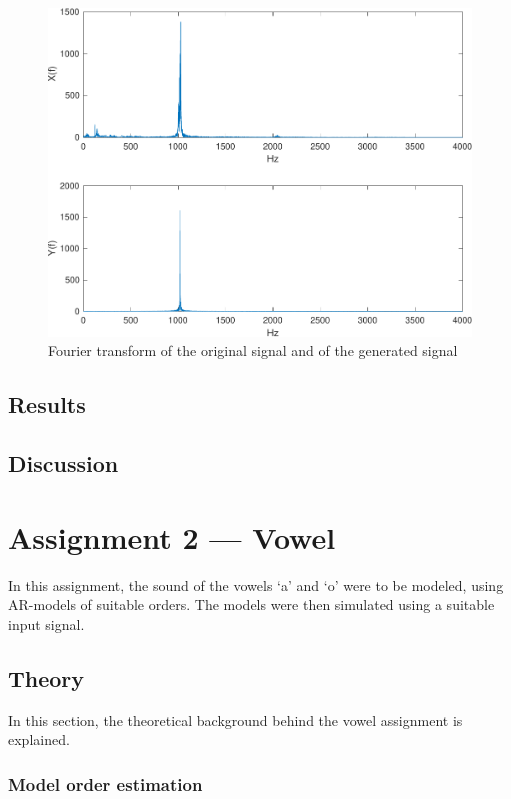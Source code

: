 \documentclass{IEEEtran}
\begin{document}
\begin{figure}[h]
  \centering
  \captionsetup{justification=centering}

  \includegraphics[width=0.8\columnwidth]{pictures/whistle_gen_freq.pdf}
  \caption{Fourier transform of the original signal and of the generated signal}
  \label{1:whistle_gen_freq}

\end{figure}

\subsection{Results}
\subsection{Discussion}

\section{Assignment 2 --- Vowel}

In this assignment, the sound of the vowels `a' and `o' were to be
modeled, using AR-models of suitable orders. The models were then
simulated using a suitable input signal.

\subsection{Theory}

In this section, the theoretical background behind the vowel assignment is
explained.

\subsubsection{Model order estimation}
\label{ssub:modelorderestimation}
\end{document}
